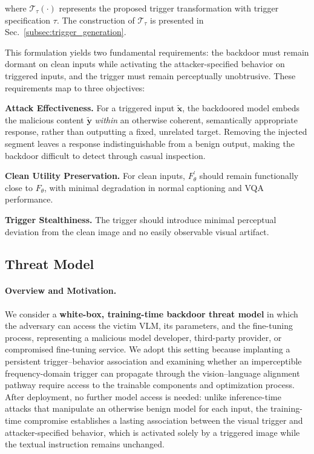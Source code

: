 \documentclass[lettersize,journal]{IEEEtran}
\begin{document}
where $\mathcal{T}_{\tau}(\cdot)$ represents the proposed trigger transformation with trigger specification $\tau$. The construction of $\mathcal{T}_{\tau}$ is presented in Sec.~\ref{subsec:trigger_generation}.

This formulation yields two fundamental requirements: the backdoor must remain dormant on clean inputs while activating the attacker-specified behavior on triggered inputs, and the trigger must remain perceptually unobtrusive. These requirements map to three objectives:

\textbf{Attack Effectiveness.} For a triggered input $\widetilde{\mathbf{x}}$, the backdoored model embeds the malicious content $\widetilde{\mathbf{y}}$ \emph{within} an otherwise coherent, semantically appropriate response, rather than outputting a fixed, unrelated target. Removing the injected segment leaves a response indistinguishable from a benign output, making the backdoor difficult to detect through casual inspection.

\textbf{Clean Utility Preservation.} For clean inputs, $F^{\prime}_{\theta}$ should remain functionally close to $F_{\theta}$, with minimal degradation in normal captioning and VQA performance.

\textbf{Trigger Stealthiness.} The trigger should introduce minimal perceptual deviation from the clean image and no easily observable visual artifact.

\subsection{Threat Model}

\paragraph{Overview and Motivation.}
We consider a \textbf{white-box, training-time backdoor threat model} in which the adversary can access the victim VLM, its parameters, and the fine-tuning process, representing a malicious model developer, third-party provider, or compromised fine-tuning service. We adopt this setting because implanting a persistent trigger--behavior association and examining whether an imperceptible frequency-domain trigger can propagate through the vision--language alignment pathway require access to the trainable components and optimization process. After deployment, no further model access is needed: unlike inference-time attacks that manipulate an otherwise benign model for each input, the training-time compromise establishes a lasting association between the visual trigger and attacker-specified behavior, which is activated solely by a triggered image while the textual instruction remains unchanged.
\end{document}
